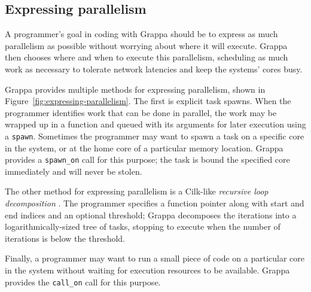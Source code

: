 \subsection{Expressing parallelism}

A programmer's goal in coding with Grappa should be to express as much
parallelism as possible without worrying about where it will execute.
Grappa then chooses where and when to execute this parallelism,
scheduling as much work as necessary to tolerate network latencies and
keep the systems' cores busy. 

Grappa provides multiple methods for expressing parallelism, shown in
Figure~\ref{fig:expressing-parallelism}. The first is explicit task
spawns. When the programmer identifies work that can be done in
parallel, the work may be wrapped up in a function and queued with its
arguments for later execution using a \texttt{spawn}. Sometimes the
programmer may want to spawn a task on a specific core in the system,
or at the home core of a particular memory location. Grappa provides a
\texttt{spawn\_on} call for this purpose; the task is bound the
specified core immediately and will never be stolen.

The other method for expressing parallelism is a Cilk-like {\em
  recursive loop decomposition} . The programmer specifies
a function pointer along with start and end indices and an optional
threshold; Grappa decomposes the iterations into a
logarithmically-sized tree of tasks, stopping to execute when the
number of iterations is below the threshold.

Finally, a programmer may want to run a small piece of code on a
particular core in the system without waiting for execution resources
to be available. Grappa provides the \texttt{call\_on} call for this
purpose.

